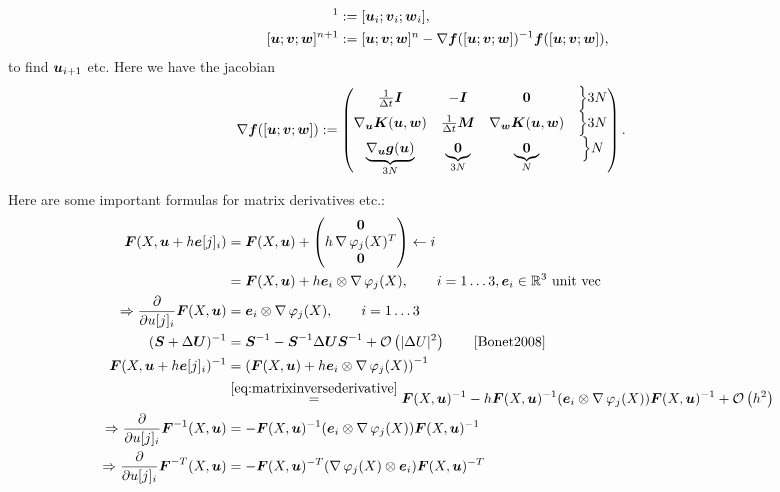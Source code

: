 \begin{align}
	[\vu; \vv; \vw]^1 &:= [\vu_i; \vv_i; \vw_i],\\
	[\vu; \vv; \vw]^{n+1} &:= [\vu; \vv; \vw]^{n} - \nabla \vf([\vu; \vv; \vw])^{-1}\vf([\vu; \vv; \vw]), 
\end{align}
to find $\boldsymbol{u}_{i+1}$ etc.
Here we have the jacobian
\begin{align}
	 \nabla \boldsymbol{f}([\boldsymbol{u}; \boldsymbol{v}; \boldsymbol{w}]) &:= \left(\begin{matrix}\frac{1}{\Delta t} \boldsymbol{I} & -\boldsymbol{I} & \boldsymbol{0} & \Bigl\rbrace3N\\
	 									\nabla_{\boldsymbol{u}}\boldsymbol{K}(\boldsymbol{u},\boldsymbol{w}) & \frac{1}{\Delta t}\boldsymbol{M} & \nabla_{\boldsymbol{w}}\boldsymbol{K}(\boldsymbol{u},\boldsymbol{w}) & \Bigl\rbrace3N\\
	 									\underbrace{\nabla_{\boldsymbol{u}}\boldsymbol{g}(\boldsymbol{u})}_{3N} & \underbrace{\boldsymbol{0}}_{3N} & \underbrace{\boldsymbol{0}}_{N} & \Bigl\rbrace N\end{matrix}\right).
\end{align}

Here are some important formulas for matrix derivatives etc.:
\begin{align}
	\vF(X,\vu + h\ve[j]_i) &= \vF(X,\vu) + \m{\vnull \\ h\divergence\varphi_j(X)^T\\ \vnull}\leftarrow i\nonumber\\
	&= \vF(X,\vu) + h\ve_i\otimes\divergence\varphi_j(X),\qquad i=1\ldots3,\ve_i\in\R^3 \text{ unit vec}\nonumber\\
	\Rightarrow \d{}{u[j]_i}\vF(X,\vu) &= \ve_i\otimes\divergence\varphi_j(X),\qquad i=1\ldots3\nonumber\\
	(\vS+\Delta\vU)^{-1} &= \vS^{-1} - \vS^{-1}\Delta\vU\vS^{-1} + \O{|\Delta U|^2}\qquad\cite[p.57]{Bonet2008}\label{eq:matrixinversederivative}\\
	\vF(X,\vu + h\ve[j]_i)^{-1} &= \left(\vF(X,\vu) + h\ve_i\otimes\divergence\varphi_j(X)\right)^{-1}\nonumber\\
		&\re{eq:matrixinversederivative}\vF(X,\vu)^{-1} - h\vF(X,\vu)^{-1}(\ve_i\otimes\divergence\varphi_j(X))\vF(X,\vu)^{-1} + \O{h^2}\nonumber\\
	\Rightarrow\d{}{u[j]_i}\vF^{-1}(X,\vu) &= -\vF(X,\vu)^{-1}(\ve_i\otimes\divergence\varphi_j(X))\vF(X,\vu)^{-1}\nonumber\\
	\Rightarrow\d{}{u[j]_i}\vF^{-T}(X,\vu) &= -\vF(X,\vu)^{-T}(\divergence\varphi_j(X)\otimes\ve_i)\vF(X,\vu)^{-T}\nonumber
\end{align}

